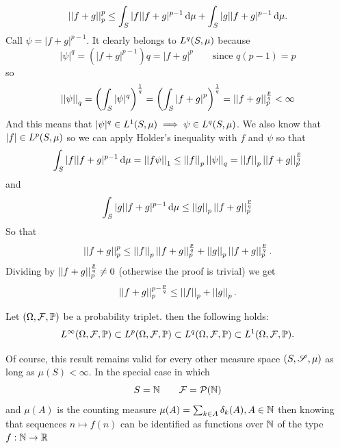 \documentclass{article}
\begin{document}
\begin{fancyproof}
	\begin{equation*}
			\left|\left|f+g\right|\right|_{p}^{p}\leq \int_S|f||f+g|^{p-1}\mathop{}\!\mathrm{d}\mu+\int_S|g||f+g|^{p-1}\mathop{}\!\mathrm{d}\mu.
	\end{equation*}
	Call $\psi=|f+g|^{p-1}$. It clearly belongs to $L^{q}(S,\mu)$ because
	\begin{equation*}
		|\psi|^{q}=\left(|f+g|^{p-1}\right)q=\left|f+g\right|^{p}\qquad\text{since }q(p-1)=p
	\end{equation*}
	so
	\begin{equation*}
		\left|\left|\psi\right|\right|_{q}=\left(\int_S|\psi|^q\right)^{\frac{1}{q}}=\left(\int_S\left|f+g\right|^{p}\right)^{\frac{1}{q}}=\left|\left|f+g\right|\right|_{p}^{\frac{p}{q}}<\infty
	\end{equation*}
	And this means that $|\psi|^{q}\in L^{1}(S,\mu)\implies\psi\in L^{q}(S,\mu)$. We also know that $|f|\in L^{p}(S,\mu)$ so we can apply Holder's inequality with $f$ and $\psi$ so that
	\begin{equation*}
		\int_S|f||f+g|^{p-1}\mathop{}\!\mathrm{d}\mu=\left|\left|f\psi\right|\right|_1\leq\left|\left|f\right|\right|_p\left|\left|\psi\right|\right|_q=\left|\left|f\right|\right|_p\left|\left|f+g\right|\right|_p^{\frac{p}{q}}
	\end{equation*}
	and
	\begin{equation*}
		\int_S|g||f+g|^{p-1}\mathop{}\!\mathrm{d}\mu\leq\left|\left|g\right|\right|_p\left|\left|f+g\right|\right|_p^{\frac{p}{q}}
	\end{equation*}
	So that
	\begin{equation*}
		\left|\left|f+g\right|\right|_p^p\leq\left|\left|f\right|\right|_p\left|\left|f+g\right|\right|_p^{\frac{p}{q}}+\left|\left|g\right|\right|_p\left|\left|f+g\right|\right|_p^{\frac{p}{q}}.
	\end{equation*}
	Dividing by $\left|\left|f+g\right|\right|_p^{\frac{p}{q}}\neq0$ (otherwise the proof is trivial) we get
	\begin{equation*}
		\left|\left|f+g\right|\right|_p^{p-\frac{p}{q}}\leq\left|\left|f\right|\right|_p+\left|\left|g\right|\right|_p.
	\end{equation*}
\end{fancyproof}
\begin{proposition}
	Let $(\Omega,\mathcal{F},\mathbb{P})$ be a probability triplet. then the following holds:
	\begin{equation*}
		L^{\infty}(\Omega,\mathcal{F},\mathbb{P})\subset L^{p}(\Omega,\mathcal{F},\mathbb{P})\subset L^{q}(\Omega,\mathcal{F},\mathbb{P})\subset L^{1}(\Omega,\mathcal{F},\mathbb{P}).
	\end{equation*}
\end{proposition}
Of course, this result remains valid for every other measure space $(S,\mathscr{S},\mu)$ as long as $\mu(S)<\infty$. In the special case in which 
\begin{equation*}
	S=\mathbb{N}\qquad\mathcal{F}=\mathcal{P}(\mathbb{N})
\end{equation*}
and $\mu(A)$ is the counting measure $\mu(A)=\sum_{k\in A}\delta_k(A),A\in\mathbb{N}$ then knowing that sequences $n\mapsto f(n)$ can be identified as functions over $\mathbb{N}$ of the type $f:\mathbb{N}\to\mathbb{R}$
\end{document}
